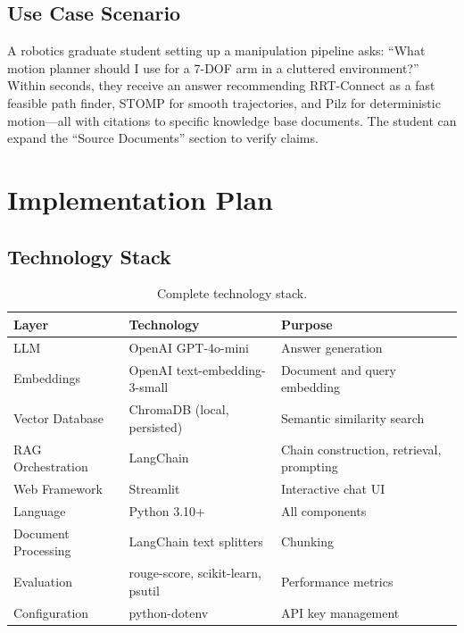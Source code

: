 \documentclass[12pt, a4paper]{article}
\begin{document}
\subsection{Use Case Scenario}

A robotics graduate student setting up a manipulation pipeline asks: ``What motion planner should I use for a 7-DOF arm in a cluttered environment?'' Within seconds, they receive an answer recommending RRT-Connect as a fast feasible path finder, STOMP for smooth trajectories, and Pilz for deterministic motion---all with citations to specific knowledge base documents. The student can expand the ``Source Documents'' section to verify claims.


\section{Implementation Plan}

\subsection{Technology Stack}

\begin{table}[h]
\centering
\begin{tabular}{@{}lll@{}}
\toprule
\textbf{Layer} & \textbf{Technology} & \textbf{Purpose} \\
\midrule
LLM & OpenAI GPT-4o-mini & Answer generation \\
Embeddings & OpenAI text-embedding-3-small & Document and query embedding \\
Vector Database & ChromaDB (local, persisted) & Semantic similarity search \\
RAG Orchestration & LangChain & Chain construction, retrieval, prompting \\
Web Framework & Streamlit & Interactive chat UI \\
Language & Python 3.10+ & All components \\
Document Processing & LangChain text splitters & Chunking \\
Evaluation & rouge-score, scikit-learn, psutil & Performance metrics \\
Configuration & python-dotenv & API key management \\
\bottomrule
\end{tabular}
\caption{Complete technology stack.}
\end{table}
\end{document}
